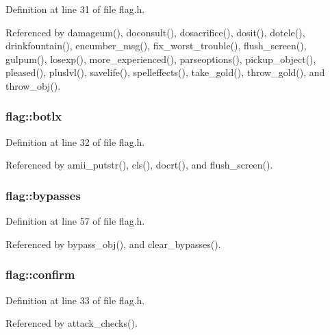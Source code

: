 Definition at line 31 of file flag.\+h.



Referenced by damageum(), doconsult(), dosacrifice(), dosit(), dotele(), drinkfountain(), encumber\+\_\+msg(), fix\+\_\+worst\+\_\+trouble(), flush\+\_\+screen(), gulpum(), losexp(), more\+\_\+experienced(), parseoptions(), pickup\+\_\+object(), pleased(), pluslvl(), savelife(), spelleffects(), take\+\_\+gold(), throw\+\_\+gold(), and throw\+\_\+obj().

\hypertarget{structflag_a4f41387168e1a58d95db3f635eec780e}{
\subsubsection[{botlx}]{ flag\+::botlx}}\label{structflag_a4f41387168e1a58d95db3f635eec780e}


Definition at line 32 of file flag.\+h.



Referenced by amii\+\_\+putstr(), cls(), docrt(), and flush\+\_\+screen().

\hypertarget{structflag_acb3f84ce448189b0bbd519bfc0b2825f}{
\subsubsection[{bypasses}]{ flag\+::bypasses}}\label{structflag_acb3f84ce448189b0bbd519bfc0b2825f}


Definition at line 57 of file flag.\+h.



Referenced by bypass\+\_\+obj(), and clear\+\_\+bypasses().

\hypertarget{structflag_ab97835d9cec46b62b236f42bfe9ce9e0}{
\subsubsection[{confirm}]{ flag\+::confirm}}\label{structflag_ab97835d9cec46b62b236f42bfe9ce9e0}


Definition at line 33 of file flag.\+h.



Referenced by attack\+\_\+checks().

